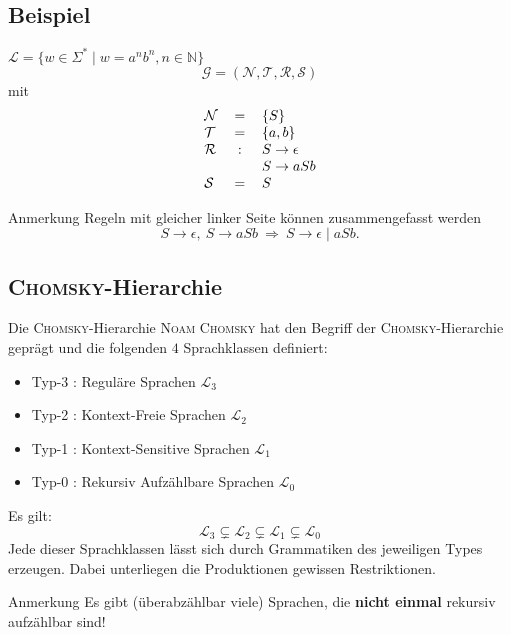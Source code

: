 \documentclass[]{beamer}
\begin{document}
\subsection{Beispiel}
\begin{frame}[squeeze]{}
  \begin{exampleblock}{$\mathcal{L} = \{w \in \Sigma^* \;|\; w = a^nb^n, n \in \mathbb{N}\}$}
    \[\mathcal{G = (N, T, R, S)}\]
    mit
    \[\begin{tabular}{l c l}
      $\mathcal{N}$ & = & $\{S\}$ \\
      $\mathcal{T}$ & = & $\{a, b\}$ \\
      $\mathcal{R}$ & : & $S \to \epsilon$ \\
                    &   & $S \to aSb$ \\
      $\mathcal{S}$ & = & $S$ \\
      \end{tabular}\]
  \end{exampleblock}
  
  \pause
  
  \begin{block}{Anmerkung}
    Regeln mit gleicher linker Seite können zusammengefasst werden 
    \[S \to \epsilon, ~ S \to aSb ~ \Rightarrow ~ S \to \epsilon \;|\; aSb.\]
  \end{block}
\end{frame}

\subsection{\textsc{Chomsky}-Hierarchie}
\begin{frame}[squeeze]{}
  \begin{block}{Die \textsc{Chomsky}-Hierarchie}
    \textsc{Noam Chomsky} hat den Begriff der \textsc{Chomsky}-Hierarchie geprägt und die folgenden $4$ Sprachklassen definiert:
    \begin{itemize}
      \item Typ-3 : Reguläre Sprachen $\mathcal{L}_3$
      \item Typ-2 : Kontext-Freie Sprachen $\mathcal{L}_2$
      \item Typ-1 : Kontext-Sensitive Sprachen $\mathcal{L}_1$
      \item Typ-0 : Rekursiv Aufzählbare Sprachen $\mathcal{L}_0$
    \end{itemize}
    \vspace*{0.5em}
    \pause
    Es gilt:
    \[\mathcal{L}_3 \subsetneq \mathcal{L}_2 \subsetneq \mathcal{L}_1 \subsetneq \mathcal{L}_0\]
    \pause
    Jede dieser Sprachklassen lässt sich durch Grammatiken des jeweiligen Types erzeugen. Dabei unterliegen die Produktionen gewissen Restriktionen.
  \end{block}
  
  \pause
  
  \begin{alertblock}{Anmerkung}
    Es gibt (überabzählbar viele) Sprachen, die \textbf{nicht einmal} rekursiv aufzählbar sind!
  \end{alertblock}
\end{frame}
\end{document}
